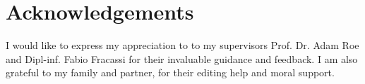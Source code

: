 \chapter*{Acknowledgements}

I would like to express my appreciation to to my supervisors Prof. Dr. Adam Roe and Dipl-inf. Fabio Fracassi for their invaluable guidance and feedback.
I am also grateful to my family and partner, for their editing help and moral support.
